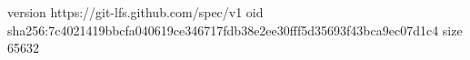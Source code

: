 version https://git-lfs.github.com/spec/v1
oid sha256:7c4021419bbcfa040619ce346717fdb38e2ee30fff5d35693f43bca9ec07d1c4
size 65632
